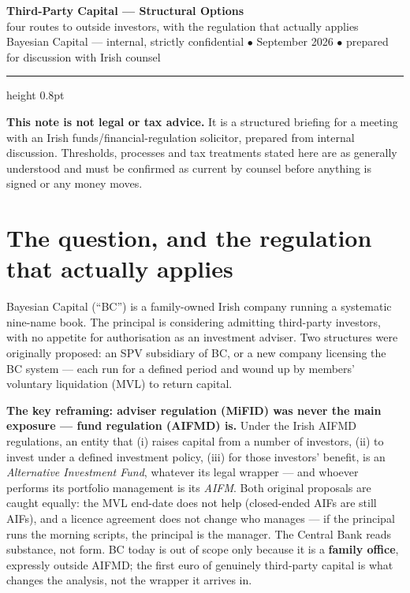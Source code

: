 \documentclass[11pt,a4paper]{article}
\begin{document}
\begin{center}
{\Large\bfseries\color{bcnavy} Third-Party Capital --- Structural Options}\\[0.15cm]
{\color{bcnavy} four routes to outside investors, with the regulation that actually applies}\\[0.25cm]
{\small\color{bcgrey} Bayesian Capital --- internal, strictly confidential
\;$\bullet$ September 2026 \;$\bullet$\; prepared for discussion with Irish counsel}
\end{center}
\vspace{0.1cm}
{\color{bcnavy}\hrule height 0.8pt}
\vspace{0.3cm}

\begin{tcolorbox}[colback=bcred!5, colframe=bcred, boxrule=0.8pt]
\footnotesize\textbf{This note is not legal or tax advice.} It is a structured
briefing for a meeting with an Irish funds/financial-regulation solicitor,
prepared from internal discussion. Thresholds, processes and tax treatments
stated here are as generally understood and must be confirmed as current by
counsel before anything is signed or any money moves.
\end{tcolorbox}

\section{The question, and the regulation that actually applies}

Bayesian Capital (``BC'') is a family-owned Irish company running a
systematic nine-name book. The principal is considering admitting third-party
investors, with no appetite for authorisation as an investment adviser. Two
structures were originally proposed: an SPV subsidiary of BC, or a new
company licensing the BC system --- each run for a defined period and wound up
by members' voluntary liquidation (MVL) to return capital.

\textbf{The key reframing: adviser regulation (MiFID) was never the main
exposure --- fund regulation (AIFMD) is.} Under the Irish AIFMD regulations,
an entity that (i) raises capital from a number of investors, (ii) to invest
under a defined investment policy, (iii) for those investors' benefit, is an
\emph{Alternative Investment Fund}, whatever its legal wrapper --- and whoever
performs its portfolio management is its \emph{AIFM}. Both original proposals
are caught equally: the MVL end-date does not help (closed-ended AIFs are
still AIFs), and a licence agreement does not change who manages --- if the
principal runs the morning scripts, the principal is the manager. The Central
Bank reads substance, not form. BC today is out of scope only because it is a
\textbf{family office}, expressly outside AIFMD; the first euro of genuinely
third-party capital is what changes the analysis, not the wrapper it arrives
in.
\end{document}

